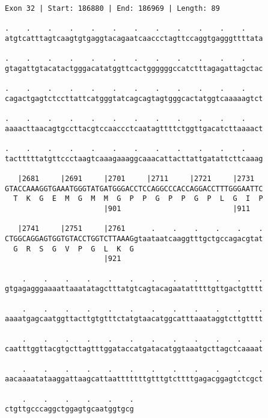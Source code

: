 \documentclass{article}
\begin{document}
\newpage
\begin{Verbatim}[fontfamily=courier]
Exon 32 | Start: 186880 | End: 186969 | Length: 89

.    .    .    .    .    .    .    .    .    .    .    .    
atgtcatttagtcaagtgtgaggtacagaatcaaccctagttccaggtgagggttttata

.    .    .    .    .    .    .    .    .    .    .    .    
gtagattgtacatactgggacatatggttcactggggggccatctttagagattagctac

.    .    .    .    .    .    .    .    .    .    .    .    
cagactgagtctccttattcatgggtatcagcagtagtgggcactatggtcaaaaagtct

.    .    .    .    .    .    .    .    .    .    .    .    
aaaacttaacagtgccttacgtccaaccctcaatagttttctggttgacatcttaaaact

.    .    .    .    .    .    .    .    .    .    .    .    
tactttttatgttccctaagtcaaagaaaggcaaacattacttattgatattcttcaaag

   |2681     |2691     |2701     |2711     |2721     |2731  
GTACCAAAGGTGAAATGGGTATGATGGGACCTCCAGGCCCACCAGGACCTTTGGGAATTC
  T  K  G  E  M  G  M  M  G  P  P  G  P  P  G  P  L  G  I  P
                       |901                          |911   

   |2741     |2751     |2761      .    .    .    .    .    .
CTGGCAGGAGTGGTGTACCTGGTCTTAAAGgtaataatcaaggtttgctgccagacgtat
  G  R  S  G  V  P  G  L  K  G                              
                       |921                                 

    .    .    .    .    .    .    .    .    .    .    .    .
gtgagagggaaaattaaatatagctttatgtcagtacagaatatttttgttgactgtttt

    .    .    .    .    .    .    .    .    .    .    .    .
aaaatgagcaatggttacttgtgtttctatgtaacatggcatttaaataggtcttgtttt

    .    .    .    .    .    .    .    .    .    .    .    .
caatttggttacgtgcttagtttggataccatgatacatggtaaatgcttagctcaaaat

    .    .    .    .    .    .    .    .    .    .    .    .
aacaaaatataaggattaagcattaatttttttgtttgtcttttgagacggagtctcgct

    .    .    .    .    .    .
ctgttgcccaggctggagtgcaatggtgcg
\end{Verbatim}
\newpage
\end{document}
